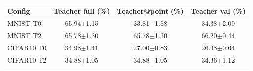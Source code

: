 \begin{tabular}{lccc}\hline
Config & Teacher full (\%) & Teacher@point (\%) & Teacher val (\%) \\\hline
MNIST T0 & 65.94$\pm$1.15 & 33.81$\pm$1.58 & 34.38$\pm$2.09 \\
MNIST T2 & 65.78$\pm$1.30 & 65.78$\pm$1.30 & 66.20$\pm$0.44 \\
CIFAR10 T0 & 34.98$\pm$1.41 & 27.00$\pm$0.83 & 26.48$\pm$0.64 \\
CIFAR10 T2 & 34.88$\pm$1.05 & 34.88$\pm$1.05 & 34.36$\pm$1.12 \\
\hline\end{tabular}
